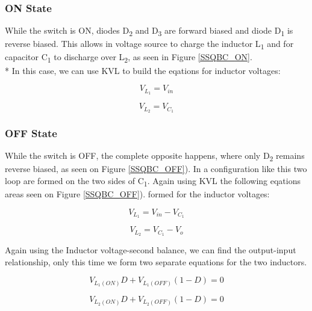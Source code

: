 \subsubsection{ON State}
While the switch is ON, diodes D\textsubscript{2} and D\textsubscript{3} are forward biased and diode D\textsubscript{1} is reverse biased.
This allows in voltage source to charge the inductor L\textsubscript{1} and for capacitor C\textsubscript{1} to discharge over L\textsubscript{2}, as seen in Figure \ref{SSQBC_ON}.
\\*
In this case, we can use KVL to build the eqations for inductor voltages: 

\begin{equation}
	V_{L_1}=V_{in}
	\label{eq:SSQBC_KVL_ON}
\end{equation}

\begin{equation}
	V_{L_2}=V_{C_1}
	\label{eq:SSQBC_KVL_ON2}
\end{equation}

\subsubsection{OFF State}
While the switch is OFF, the complete opposite happens, where only D\textsubscript{2} remains reverse biased, as seen on Figure \ref{SSQBC_OFF}).
In a configuration like this two loop are formed on the two sides of C\textsubscript{1}. Again using KVL the following eqations areas seen on Figure \ref{SSQBC_OFF}). formed for the inductor voltages:

\begin{equation}
	V_{L_1}=V_{in}-V_{C_1}
	\label{eq:SSQBC_KVL_OFF}
\end{equation}

\begin{equation}
	V_{L_2}=V_{C_1}-V_{o}
	\label{eq:SSQBC_KVL_OFF2}
\end{equation}

Again using the Inductor voltage-second balance, we can find the output-input relationship, only this time we form two separate equations for the two inductors. 

\begin{equation}
	V_{L_1(ON)}D+V_{L_1(OFF)}(1-D)=0
	\label{eq:SSQBC_IVSB}
\end{equation}

\begin{equation}
	V_{L_2(ON)}D+V_{L_2(OFF)}(1-D)=0
	\label{eq:SSQBC_IVSB2}
\end{equation}


